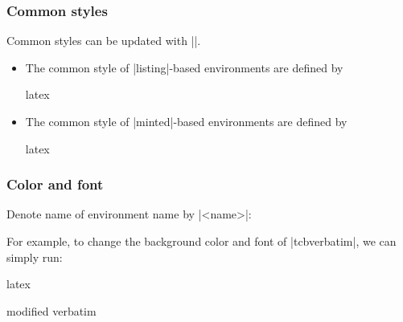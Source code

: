 \documentclass[letterpaper, 11pt, DIV=11]{scrartcl}
\begin{document}
\subsubsection{Common styles}

Common styles can be updated with \texinline|\tcbset|.

\begin{itemize}
\item The common style of \rawinline|listing|-based environments are defined by
\begin{tcbsrccode}{latex}
\end{tcbsrccode}
\item The common style of \rawinline|minted|-based environments are defined by
\begin{tcbsrccode}{latex}
\end{tcbsrccode}

\end{itemize}

\subsubsection{Color and font}

Denote name of environment name by \rawinline|<name>|:

For example, to change the background color and font of \rawinline|tcbverbatim|, we can simply run:
\begin{tcbsrccode}{latex}
\renewcommand{\tcbverbatimfont}{\linespread{0.9}\fontsize{8}{8}\fontfamily{lmr}}
\begin{tcbverbatim}
modified verbatim
\end{tcbverbatim}
\end{tcbsrccode}
\end{document}
